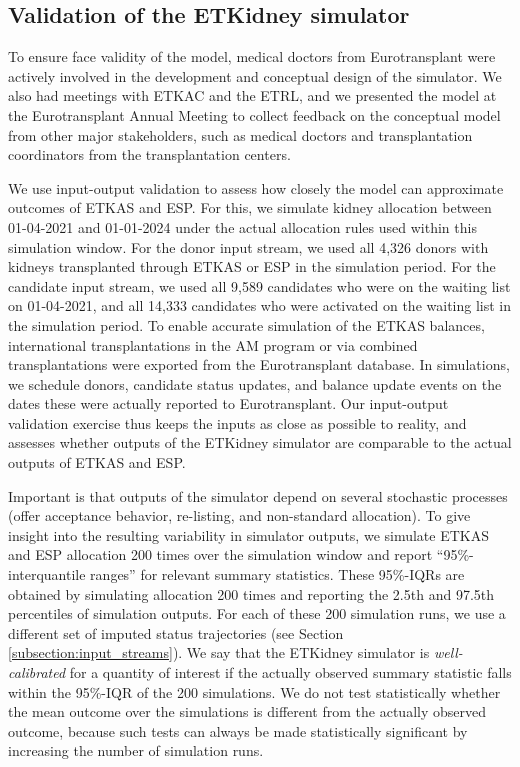 \subsection{Validation of the ETKidney simulator}
\label{section:validation}
To ensure face validity of the model, medical doctors from Eurotransplant were actively involved in the development and conceptual design of the simulator. We also had meetings with ETKAC and the ETRL, and we presented the model at the Eurotransplant Annual Meeting to collect feedback on the conceptual model from other major stakeholders, such as medical doctors and transplantation coordinators from the transplantation centers.
\par 
We use input-output validation to assess how closely the model can approximate outcomes of ETKAS and ESP. For this, we simulate kidney allocation between 01-04-2021 and 01-01-2024 under the actual allocation rules used within this simulation window. For the donor input stream, we used all 4,326 donors with kidneys transplanted through ETKAS or ESP in the simulation period. For the candidate input stream, we used all 9,589 candidates who were on the waiting list on 01-04-2021, and all 14,333 candidates who were activated on the waiting list in the simulation period. To enable accurate simulation of the ETKAS balances, international transplantations in the AM program or via combined transplantations were exported from the Eurotransplant database. In simulations, we schedule donors, candidate status updates, and balance update events on the dates these were actually reported to Eurotransplant. Our input-output validation exercise thus keeps the inputs as close as possible to reality, and assesses whether outputs of the ETKidney simulator are comparable to the actual outputs of ETKAS and ESP.
\par
Important is that outputs of the simulator depend on several stochastic processes (offer acceptance behavior, re-listing, and non-standard allocation). To give insight into the resulting variability in simulator outputs, we simulate ETKAS and ESP allocation 200 times over the simulation window and report \enquote{95\%-interquantile ranges} for relevant summary statistics. These 95\%-IQRs are obtained by simulating allocation 200 times and reporting the 2.5th and 97.5th percentiles of simulation outputs. For each of these 200 simulation runs, we use a different set of imputed status trajectories (see Section \ref{subsection:input_streams}). We say that the ETKidney simulator is \textit{well-calibrated} for a quantity of interest if the actually observed summary statistic falls within the 95\%-IQR of the 200 simulations. We do not test statistically whether the mean outcome over the simulations is different from the actually observed outcome, because such tests can always be made statistically significant by increasing the number of simulation runs.

